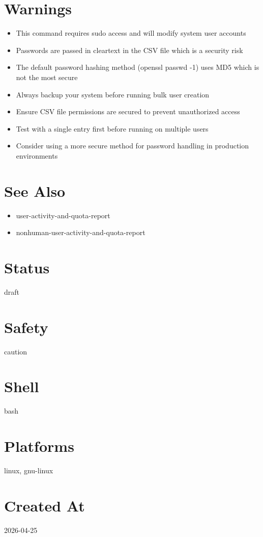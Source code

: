 \documentclass[openany]{book}
\begin{document}
\section*{Warnings}
\begin{itemize}
  \item This command requires sudo access and will modify system user accounts
  \item Passwords are passed in cleartext in the CSV file which is a security risk
  \item The default password hashing method (openssl passwd -1) uses MD5 which is not the most secure
  \item Always backup your system before running bulk user creation
  \item Ensure CSV file permissions are secured to prevent unauthorized access
  \item Test with a single entry first before running on multiple users
  \item Consider using a more secure method for password handling in production environments
\end{itemize}

\section*{See Also}
\begin{itemize}
  \item user-activity-and-quota-report
  \item nonhuman-user-activity-and-quota-report
\end{itemize}

\section*{Status}
draft

\section*{Safety}
caution

\section*{Shell}
bash

\section*{Platforms}
linux, gnu-linux

\section*{Created At}
2026-04-25
\end{document}
